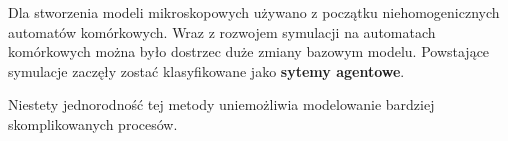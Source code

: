 Dla stworzenia modeli mikroskopowych używano z początku niehomogenicznych automatów komórkowych. Wraz z rozwojem symulacji na automatach komórkowych można było dostrzec duże zmiany bazowym modelu. Powstające symulacje zaczęły zostać klasyfikowane jako \textbf{sytemy agentowe}.

Niestety jednorodność tej metody uniemożliwia modelowanie bardziej skomplikowanych procesów\cite{FormalizacjaAutomatów}.



















